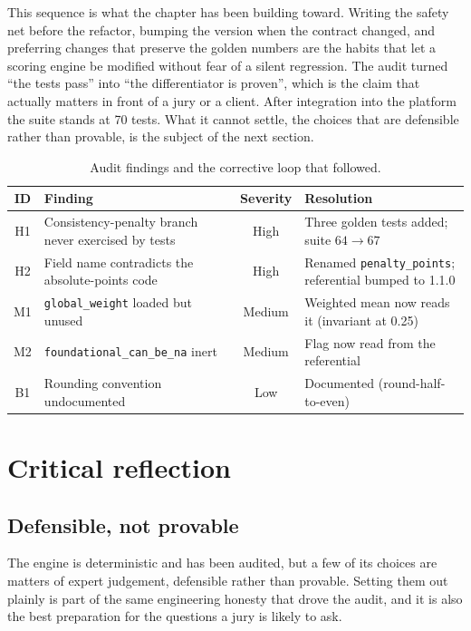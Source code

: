 This sequence is what the chapter has been building toward. Writing the safety net
before the refactor, bumping the version when the contract changed, and preferring
changes that preserve the golden numbers are the habits that let a scoring engine be
modified without fear of a silent regression. The audit turned ``the tests
pass'' into ``the differentiator is proven'', which is the claim that actually
matters in front of a jury or a client. After integration into the platform the
suite stands at 70 tests. What it cannot settle, the choices that are defensible
rather than provable, is the subject of the next section.

\begin{table}[htbp]
  \centering
  \caption{Audit findings and the corrective loop that followed.}
  \label{tab:se-audit}
  \begin{tabular}{@{}cp{4.7cm}cp{5.6cm}@{}}
    \toprule
    ID & Finding & Severity & Resolution \\
    \midrule
    H1 & Consistency-penalty branch never exercised by tests & High &
         Three golden tests added; suite $64 \rightarrow 67$ \\
    H2 & Field name contradicts the absolute-points code & High &
         Renamed \texttt{penalty\_points}; referential bumped to 1.1.0 \\
    M1 & \texttt{global\_weight} loaded but unused & Medium &
         Weighted mean now reads it (invariant at 0.25) \\
    M2 & \texttt{foundational\_can\_be\_na} inert & Medium &
         Flag now read from the referential \\
    B1 & Rounding convention undocumented & Low &
         Documented (round-half-to-even) \\
    \bottomrule
  \end{tabular}
\end{table}


\section{Critical reflection}
\label{sec:se-reflection}

\subsection{Defensible, not provable}

The engine is deterministic and has been audited, but a few of its choices are
matters of expert judgement, defensible rather than provable. Setting them out
plainly is part of the same engineering honesty that drove the audit, and it is also
the best preparation for the questions a jury is likely to ask.


